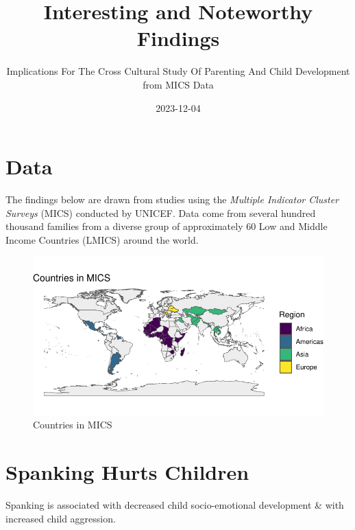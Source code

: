 \documentclass[
  letterpaper,
  DIV=11,
  numbers=noendperiod]{scrartcl}
\title{Interesting and Noteworthy Findings}
\subtitle{Implications For The Cross Cultural Study Of Parenting And
Child Development from MICS Data}
\author{}
\date{2023-12-04}
\makeatletter
\renewcommand{\maketitle}{\bgroup\setlength{\parindent}{0pt}
\begin{flushleft}
  {\sffamily\huge\textbf{\MakeUppercase{\@title}}} \vspace{0.3cm} \newline
  {\Large {\@subtitle}} \newline
  \@author
\end{flushleft}\egroup
}
\makeatother
\begin{document}
\maketitle
\pagestyle{mystyle}

\ifdefined\Shaded\renewenvironment{Shaded}{\begin{tcolorbox}[borderline west={3pt}{0pt}{shadecolor}, boxrule=0pt, enhanced, sharp corners, frame hidden, colback={codebgcolor}, breakable]}{\end{tcolorbox}}\fi

\hypertarget{data}{%
\section{Data}\label{data}}

The findings below are drawn from studies using the \emph{Multiple
Indicator Cluster Surveys} (MICS) conducted by UNICEF. Data come from
several hundred thousand families from a diverse group of approximately
60 Low and Middle Income Countries (LMICS) around the world.

\begin{figure}[H]

{\centering \includegraphics{MICS-infographic_files/figure-pdf/fig-MICS-1.pdf}

}

\caption{\label{fig-MICS}Countries in MICS}

\end{figure}

\hypertarget{spanking-hurts-children}{%
\section{Spanking Hurts Children}\label{spanking-hurts-children}}

Spanking is associated with decreased child socio-emotional development
\& with increased child aggression.
\end{document}
